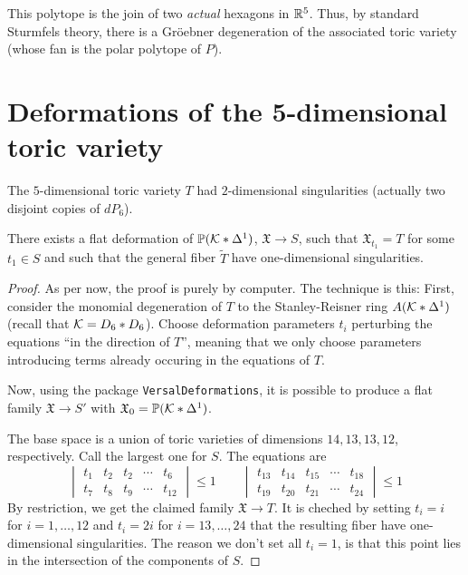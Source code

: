 \documentclass[11pt, english]{article}
\begin{document}
This polytope is the join of two \emph{actual} hexagons in $\mathbb{R}^5$. Thus, by standard Sturmfels theory, there is a Gröebner degeneration of the associated toric variety (whose fan is the polar polytope of $P$).

\section{Deformations of the 5-dimensional toric variety}

The $5$-dimensional toric variety $T$ had $2$-dimensional singularities (actually two disjoint copies of $dP_6$).

\begin{thm}
There exists a flat deformation of $\mathbb{P}(\mathcal K \ast \Delta^1)$, $\mathfrak X \to S$, such that $\mathfrak X_{t_1} = T$ for some $t_1 \in S$ and such that the general fiber $\widetilde T$ have one-dimensional singularities.
\end{thm}
\begin{proof}
 As per now, the proof is purely by computer. The technique is this: First, consider the monomial degeneration of $T$ to the Stanley-Reisner ring $A(\mathcal K \ast \Delta^1)$ (recall that $\mathcal K=D_6 \ast D_6$). Choose deformation parameters $t_i$ perturbing the equations ``in the direction of $T$'', meaning that we only choose parameters introducing terms already occuring in the equations of $T$.

Now, using the package \verb|VersalDeformations|, it is possible to produce a flat family $\mathfrak X \to S'$ with $\mathfrak X_0 = \mathbb{P}(\mathcal K \ast \Delta^1)$.

The base space is a union of toric varieties of dimensions $14,13,13,12$, respectively. Call the largest one for $S$. The equations are 
\[
\begin{vmatrix}
 t_1 & t_2 & t_2 &  \cdots & t_{6} \\
 t_7 & t_8 &  t_9 & \cdots & t_{12} 
\end{vmatrix} \leq 1 \qquad 
\begin{vmatrix}
 t_{13} & t_{14} & t_{15} &  \cdots & t_{18} \\
 t_{19} & t_{20}  & t_{21} & \cdots & t_{24} 
\end{vmatrix} \leq 1 
\]
By restriction, we get the claimed family $\mathfrak X \to T$. It is cheched by setting $t_i=i$ for $i=1,\ldots,12$ and $t_i=2i$ for $i=13,\ldots,24$ that the resulting fiber have one-dimensional singularities. The reason we don't set all $t_i=1$, is that this point lies in the intersection of the components of $S$. 
\end{proof}
\end{document}
